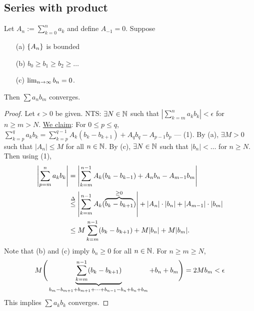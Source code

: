 \documentclass[]{article}
\begin{document}
\subsection{Series with product}

\begin{theorem}
	Let $A_n:=\sum_{k=0}^n a_k$ and define $A_{-1}=0$. Suppose
	\begin{enumerate}
		\item[(a)] $\set{A_n}$ is bounded
		\item[(b)] $b_0\geq b_1\geq b_2\geq \dots$
		\item[(c)] $\lim_{n\ra\infty} b_n = 0$.
	\end{enumerate}
	Then $\sum a_nb_m$ converges.
\end{theorem}

\begin{proof}
	Let $\epsilon>0$ be given. NTS: $\exists N\in\mb N$ such that $|\sum_{k=m}^n a_kb_k|<\epsilon$ for $n\geq m>N$.
	\ul{We claim}: For $0\leq p\leq q$, $\sum_{k=p}^q a_kb_k = \sum_{k=p}^{q-1} A_k(b_k-b_{k+1}) + A_qb_q - A_{p-1}b_p$ --- (1).
	By (a), $\exists M>0$ such that $|A_n|\leq M$ for all $n\in\mb N$.
	By (c), $\exists N\in\mb N$ such that $|b_n|<\dots$ for $n\geq N$.
	Then using (1), 
	\begin{align*}
		\left|\sum_{p=m}^n a_kb_k\right| &= \left|\sum_{k=m}^{n-1} A_k(b_k-b_{k-1}) + A_nb_n - A_{m-1}b_m\right| \\
										 &\os{\Delta}{\leq} \left|\sum_{k=m}^{n-1} A_k(\ob{\geq0}{b_k-b_{k+1}})\right| + |A_n|\cdot|b_n| + |A_{m-1}|\cdot|b_m| \\
										 &\leq M\sum_{k=m}^{n-1} (b_k-b_{k+1}) + M|b_n| + M|b_m|.
	\end{align*}
	Note that (b) and (c) imply $b_n\geq 0$ for all $n\in\mb N$. For $n\geq m\geq N$,
	$$M\Bigg(\ub{b_m-b_{m+1}+b_{m+1}+\dots+b_{n-1}-b_n+b_n + b_m}{\sum_{k=m}^{n-1}(b_k-b_{k+1})}+b_n+b_m\Bigg) = 2Mb_m <\epsilon$$ 
	This implies $\sum a_k b_k$ converges.
\end{proof}
\end{document}
